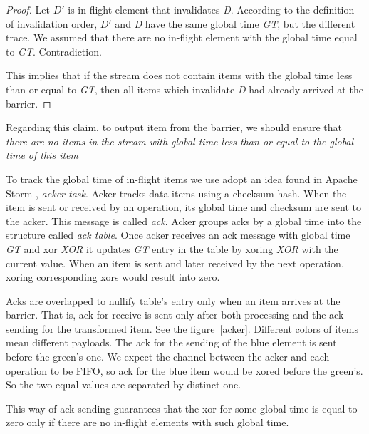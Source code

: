\begin{proof}
  Let {\it $D\prime$} is in-flight element that invalidates {\it D}. According to the definition of invalidation order, {\it $D\prime$} and {\it D} have the same global time {\it GT}, but the different trace. We assumed that there are no in-flight element with the global time equal to {\it GT}. Contradiction.

  This implies that if the stream does not contain items with the global time less than or equal to {\it GT}, then all items which invalidate {\it D} had already arrived at the barrier. 
\end{proof}

Regarding this claim, to output item from the barrier, we should ensure that {\it there are no items in the stream with global time less than or equal to the global time of this item}

To track the global time of in-flight items we use adopt an idea found in Apache Storm \cite{apache:storm}, {\it acker task}. Acker tracks data items using a checksum hash. When the item is sent or received by an operation, its global time and checksum are sent to the acker. This message is called {\it ack}. Acker groups acks by a global time into the structure called {\it ack table}. Once acker receives an ack message with global time {\it GT} and xor {\it XOR} it updates {\it GT} entry in the table by xoring {\it XOR} with the current value. When an item is sent and later received by the next operation, xoring corresponding xors would result into zero.

Acks are overlapped to nullify table's entry only when an item arrives at the barrier. That is, ack for receive is sent only after both processing and the ack sending for the transformed item. See the figure~\ref{acker}. Different colors of items mean different payloads. The ack for the sending of the blue element is sent before the green's one. We expect the channel between the acker and each operation to be FIFO, so ack for the blue item would be xored before the green's. So the two equal values are separated by distinct one. 

This way of ack sending guarantees that the xor for some global time is equal to zero only if there are no in-flight elements with such global time.

